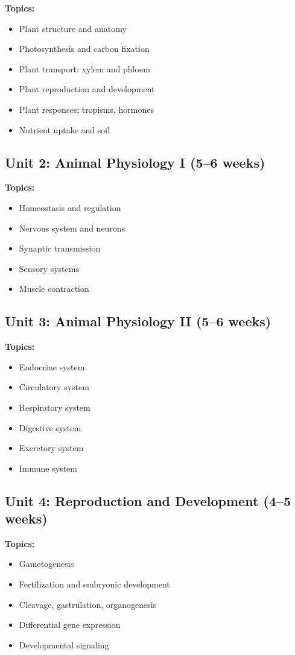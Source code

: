 \documentclass[12pt,oneside]{book}
\begin{document}
\textbf{Topics:}
\begin{itemize}
    \item Plant structure and anatomy
    \item Photosynthesis and carbon fixation
    \item Plant transport: xylem and phloem
    \item Plant reproduction and development
    \item Plant responses: tropisms, hormones
    \item Nutrient uptake and soil
\end{itemize}

\subsection{Unit 2: Animal Physiology I (5--6 weeks)}

\textbf{Topics:}
\begin{itemize}
    \item Homeostasis and regulation
    \item Nervous system and neurons
    \item Synaptic transmission
    \item Sensory systems
    \item Muscle contraction
\end{itemize}

\subsection{Unit 3: Animal Physiology II (5--6 weeks)}

\textbf{Topics:}
\begin{itemize}
    \item Endocrine system
    \item Circulatory system
    \item Respiratory system
    \item Digestive system
    \item Excretory system
    \item Immune system
\end{itemize}

\subsection{Unit 4: Reproduction and Development (4--5 weeks)}

\textbf{Topics:}
\begin{itemize}
    \item Gametogenesis
    \item Fertilization and embryonic development
    \item Cleavage, gastrulation, organogenesis
    \item Differential gene expression
    \item Developmental signaling
\end{itemize}
\end{document}
